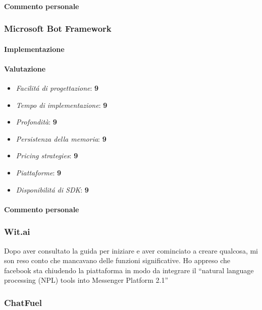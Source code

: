 \documentclass[]{article}
\begin{document}
\paragraph{Commento personale}

\subsubsection{Microsoft Bot Framework}
\paragraph{Implementazione}
\paragraph{Valutazione}
\begin{itemize}
\item \textit{Facilitá di progettazione}: \textbf{9} \\
\item \textit{Tempo di implementazione}: \textbf{9} \\
\item \textit{Profondità}: \textbf{9} \\
\item \textit{Persistenza della memoria}: \textbf{9} \\
\item \textit{Pricing strategies}: \textbf{9} \\
\item \textit{Piattaforme}: \textbf{9} \\
\item \textit{Disponibilitá di SDK}: \textbf{9} \\
\end{itemize}
\paragraph{Commento personale}

\subsubsection{Wit.ai}
Dopo aver consultato la guida per iniziare e aver cominciato a creare qualcosa, mi son reso conto che mancavano delle funzioni significative. Ho appreso che facebook sta chiudendo la piattaforma in modo da integrare il “natural language processing (NPL)  tools into Messenger Platform 2.1”

\subsubsection{ChatFuel}
\end{document}
